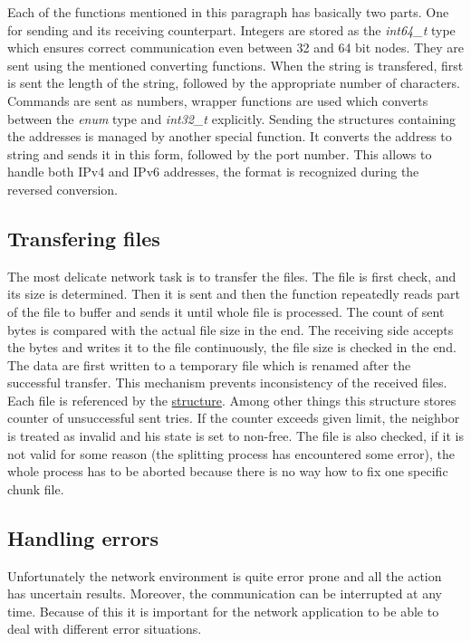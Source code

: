 Each of the functions mentioned in this paragraph has basically two
parts. One for sending and its receiving counterpart. Integers are
stored as the \textit{int64\_t} type which ensures correct communication
even between 32 and 64 bit nodes. They are sent using the mentioned
converting functions. When the string is transfered, first is sent the
length of the string, followed by the appropriate number of characters.
Commands are sent as numbers, wrapper functions are used which converts
between the \textit{enum} type and \textit{int32\_t} explicitly. Sending
the structures containing the addresses is managed by another special
function. It converts the address to string and sends it in this form,
followed by the port number. This allows to handle both IPv4 and IPv6
addresses, the format is recognized during the reversed conversion.

\subsection*{Transfering files}

The most delicate network task is to transfer the files. The file is
first check, and its size is determined. Then it is sent and then the
function repeatedly reads part of the file to buffer and sends it until
whole file is processed. The count of sent bytes is compared with the
actual file size in the end. The receiving side accepts the bytes and
writes it to the file continuously, the file size is checked in the end.
The data are first written to a temporary file which is renamed after
the successful transfer. This mechanism prevents inconsistency of the
received files. Each file is referenced by the
\hyperref[the-transferinfo-structure]{structure}. Among other things
this structure stores counter of unsuccessful sent tries. If the counter
exceeds given limit, the neighbor is treated as invalid and his state is
set to non-free. The file is also checked, if it is not valid for some
reason (the splitting process has encountered some error), the whole
process has to be aborted because there is no way how to fix one
specific chunk file.

\subsection{Handling errors}\label{handling-errors}

Unfortunately the network environment is quite error prone and all the
action has uncertain results. Moreover, the communication can be
interrupted at any time. Because of this it is important for the network
application to be able to deal with different error situations.

